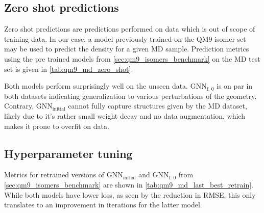 \subsection{Zero shot predictions}
\label{sec:qm9_md_isomers_zero_shot}
Zero shot predictions are predictions performed on data which is out of scope of training data. In our case, a model previously trained on the QM9  isomer set may be used to predict the density for a given MD sample. Prediction metrics using the pre trained models from \autoref{sec:qm9_isomers_benchmark} on the MD test set is given in \autoref{tab:qm9_md_zero_shot}. 
\begin{table}[h]
    \centering
    \caption[GNN zero shot predictions on QM9 isomers MD]{GNN zero shot predictions on the QM9 isomer MD test set. $\text{GNN}_\text{initial}$ and $\text{GNN}_\text{f. 0}$ were trained using the QM9 isomer set.}
    \label{tab:qm9_md_zero_shot}
\end{table}
Both models perform surprisingly well on the unseen data. $\text{GNN}_\text{f. 0}$ is on par in both datasets indicating generalization to various perturbations of the geometry. Contrary, $\text{GNN}_\text{initial}$ cannot fully capture structures given by the MD dataset, likely due to it's rather small weight decay and no data augmentation, which makes it prone to overfit on data. 


\subsection{Hyperparameter tuning}
\label{sec:qm9_md_isomers_hyp_tuning}
Metrics for retrained versions of $\text{GNN}_\text{initial}$ and $\text{GNN}_\text{f. 0}$ from \autoref{sec:qm9_isomers_benchmark} are shown in \autoref{tab:qm9_md_last_best_retrain}. While both models have lower loss, as seen by the reduction in RMSE, this only translates to an improvement in iterations for the latter model. 

